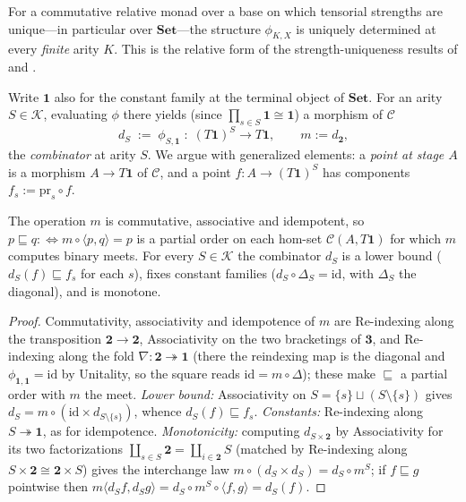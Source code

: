 \begin{proposition}\label{prop:finite-uniqueness}
For a commutative relative monad over a base on which tensorial strengths are unique---in particular over $\mathbf{Set}$---the structure $\phi_{K,X}$ is uniquely determined at every \emph{finite} arity $K$. This is the relative form of the strength-uniqueness results of \citet{kock:1972} and \citet{mcdermott-uustalu:2022}.
\end{proposition}

Write $\mathbf 1$ also for the constant family at the terminal object of $\mathbf{Set}$. For an arity $S\in\mathcal{K}$, evaluating $\phi$ there yields (since $\prod_{s\in S}\mathbf 1\cong\mathbf 1$) a morphism of $\mathcal{C}$
\[
  d_S\;:=\;\phi_{S,\mathbf 1}\;\colon\;(T\mathbf 1)^{S}\longrightarrow T\mathbf 1,\qquad m:=d_{\mathbf 2},
\]
the \emph{combinator} at arity $S$. We argue with generalized elements: a \emph{point at stage $A$} is a morphism $A\to T\mathbf 1$ of $\mathcal{C}$, and a point $f\colon A\to(T\mathbf 1)^{S}$ has components $f_s:=\mathrm{pr}_s\circ f$.

\begin{lemma}\label{lem:terminal-meet}
The operation $m$ is commutative, associative and idempotent, so $p\sqsubseteq q:\Longleftrightarrow m\circ\langle p,q\rangle=p$ is a partial order on each hom-set $\mathcal{C}(A,T\mathbf 1)$ for which $m$ computes binary meets. For every $S\in\mathcal{K}$ the combinator $d_S$ is a lower bound \textnormal{(}$d_S(f)\sqsubseteq f_s$ for each $s$\textnormal{)}, fixes constant families \textnormal{(}$d_S\circ\Delta_S=\mathrm{id}$, with $\Delta_S$ the diagonal\textnormal{)}, and is monotone.
\end{lemma}

\begin{proof}
Commutativity, associativity and idempotence of $m$ are Re-indexing along the transposition $\mathbf 2\to\mathbf 2$, Associativity on the two bracketings of $\mathbf 3$, and Re-indexing along the fold $\nabla\colon\mathbf 2\twoheadrightarrow\mathbf 1$ (there the reindexing map is the diagonal and $\phi_{\mathbf 1,\mathbf 1}=\mathrm{id}$ by Unitality, so the square reads $\mathrm{id}=m\circ\Delta$); these make $\sqsubseteq$ a partial order with $m$ the meet. \emph{Lower bound:} Associativity on $S=\{s\}\sqcup(S\setminus\{s\})$ gives $d_S=m\circ(\mathrm{id}\times d_{S\setminus\{s\}})$, whence $d_S(f)\sqsubseteq f_s$. \emph{Constants:} Re-indexing along $S\twoheadrightarrow\mathbf 1$, as for idempotence. \emph{Monotonicity:} computing $d_{S\times\mathbf 2}$ by Associativity for its two factorizations $\coprod_{s\in S}\mathbf 2=\coprod_{i\in\mathbf 2}S$ (matched by Re-indexing along $S\times\mathbf 2\cong\mathbf 2\times S$) gives the interchange law $m\circ(d_S\times d_S)=d_S\circ m^{S}$; if $f\sqsubseteq g$ pointwise then $m\langle d_Sf,d_Sg\rangle=d_S\circ m^{S}\circ\langle f,g\rangle=d_S(f)$.
\end{proof}

